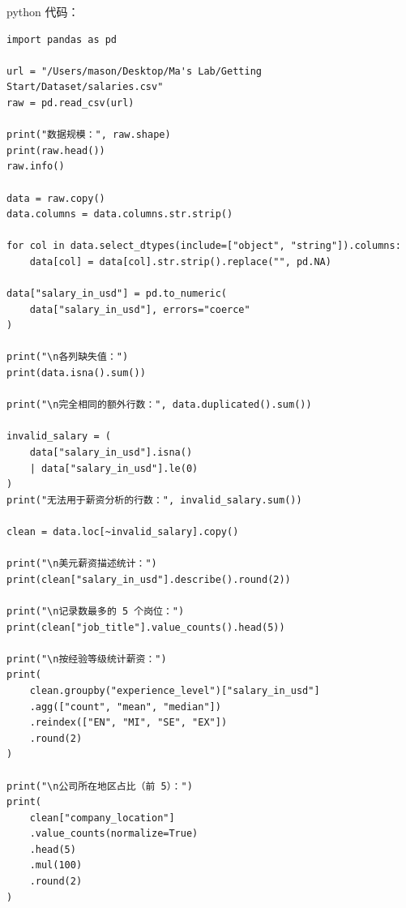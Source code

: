 \documentclass[UTF8,a4paper,11pt,fontset=fandol]{ctexart}
\begin{document}
python 代码：
\begin{verbatim}
import pandas as pd

url = "/Users/mason/Desktop/Ma's Lab/Getting Start/Dataset/salaries.csv"
raw = pd.read_csv(url)

print("数据规模：", raw.shape)
print(raw.head())
raw.info()

data = raw.copy()
data.columns = data.columns.str.strip()

for col in data.select_dtypes(include=["object", "string"]).columns:
    data[col] = data[col].str.strip().replace("", pd.NA)

data["salary_in_usd"] = pd.to_numeric(
    data["salary_in_usd"], errors="coerce"
)

print("\n各列缺失值：")
print(data.isna().sum())

print("\n完全相同的额外行数：", data.duplicated().sum())

invalid_salary = (
    data["salary_in_usd"].isna()
    | data["salary_in_usd"].le(0)
)
print("无法用于薪资分析的行数：", invalid_salary.sum())

clean = data.loc[~invalid_salary].copy()

print("\n美元薪资描述统计：")
print(clean["salary_in_usd"].describe().round(2))

print("\n记录数最多的 5 个岗位：")
print(clean["job_title"].value_counts().head(5))

print("\n按经验等级统计薪资：")
print(
    clean.groupby("experience_level")["salary_in_usd"]
    .agg(["count", "mean", "median"])
    .reindex(["EN", "MI", "SE", "EX"])
    .round(2)
)

print("\n公司所在地区占比（前 5）：")
print(
    clean["company_location"]
    .value_counts(normalize=True)
    .head(5)
    .mul(100)
    .round(2)
)
\end{verbatim}
\end{document}
